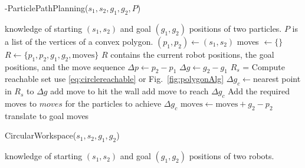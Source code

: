 \begin{algorithm}[htb]
\caption{ { -ParticlePathPlanning}($s_1,s_2,g_1,g_2,P$)}\label{alg:optimalAlg}
\begin{algorithmic}[1]
\Require knowledge of starting $(s_1,s_2)$ and goal $(g_1,g_2)$ positions of  two particles. 
 $P$ is a list of the vertices of a convex polygon. 
 \State $(p_1,p_2) \gets (s_1,s_2) $
\State  moves $\gets \{\}$
 \State $R \gets   \{ p_1,p_2,g_1,g_2  ,\textrm{moves}\} $ \Comment $R$ contains the current robot positions, the goal positions, and the move sequence
 \State $\Delta p \gets p_2-p_1$
 \State $\Delta g \gets g_2-g_1$
\State $R_s$ = Compute reachable set  \Comment use \eqref{eq:circlereachable} or Fig.~\ref{fig:polygonAlg}
\State $ \Delta g_c\gets $nearest point in $R_s$ to $\Delta g$
\State  add move to hit the wall
\State  add move to reach  $ \Delta g_c$
\State Add the required moves to $moves$ for the particles to achieve $\Delta g_c$ 
\EndWhile
\State $\textrm{moves} \gets \textrm{moves}+ {g_2 - p_2}$  \Comment translate to goal
\State \Return moves
\end{algorithmic}
\end{algorithm}

\begin{algorithm}[htb]
\caption{ { \sc CircularWorkspace}($s_1,s_2,g_1,g_2$)}\label{alg:circularReachbale}
\begin{algorithmic}[1]
\Require knowledge of starting $(s_1,s_2)$ and goal $(g_1,g_2)$ positions of  two robots. 
\State 
\end{algorithmic}
\end{algorithm}


